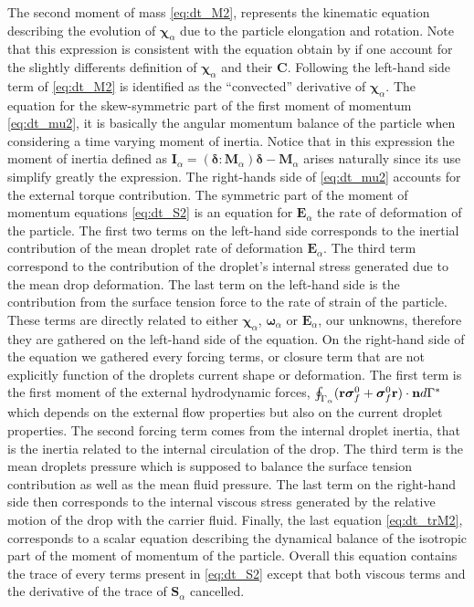 The second moment of mass \ref{eq:dt_M2}, represents the kinematic equation describing the evolution of $\bm\chi_\alpha$ due to the particle elongation and rotation. 
Note that this expression is consistent with the equation obtain by \citet{goddard1967nonlinear} if one account for the slightly differents definition of $\bm\chi_\alpha$ and their \textbf{C}.
Following \citet{goddard1967nonlinear} the left-hand side term of \ref{eq:dt_M2} is identified as the ``convected'' derivative of $\bm\chi_\alpha$. 
The equation for the skew-symmetric part of the first moment of momentum \ref{eq:dt_mu2}, it is basically the angular momentum balance of the particle when considering a time varying moment of inertia.
Notice that in this expression the moment of inertia defined as $\textbf{I}_\alpha = (\bm\delta : \textbf{M}_\alpha)\bm\delta - \textbf{M}_\alpha$ arises naturally since its use simplify greatly the expression. 
The right-hands side of \ref{eq:dt_mu2} accounts for the external torque contribution. 
The symmetric part of the moment of momentum equations \ref{eq:dt_S2} is an equation for $\textbf{E}_\alpha$ the rate of deformation of the particle. 
The first two terms on the left-hand side corresponds to the inertial contribution of the mean droplet rate of deformation $\textbf{E}_\alpha$. 
The third term correspond to the contribution of the droplet's internal stress generated due to the mean drop deformation. 
The last term on the left-hand side is the contribution from the surface tension force to the rate of strain of the particle. 
These terms are directly related to either $\bm\chi_\alpha$, $\bm\omega_\alpha$ or $\textbf{E}_\alpha$, our unknowns, therefore they are gathered on the left-hand side of the equation. 
On the right-hand side of the equation we gathered every forcing terms, or closure term that are not explicitly function of the droplets current shape or deformation.  
The first term is the first moment of the external hydrodynamic forces, $\oint_{\Gamma_{\alpha}} (\textbf{r}\bm\sigma_f^0+ \bm\sigma_f^0\textbf{r})\cdot \textbf{n} d\Gamma^*$ which depends on the external flow properties but also on the current droplet properties. 
The second forcing term comes from the internal droplet inertia, that is the inertia related to the internal circulation of the drop. 
The third term is the mean droplets pressure which is supposed to balance the surface tension contribution as well as the mean fluid pressure. 
The last term on the right-hand side then corresponds to the internal viscous stress generated by the relative motion of the drop with the carrier fluid. 
Finally, the last equation \eqref{eq:dt_trM2}, corresponds to a scalar equation describing the dynamical balance of the isotropic part of the moment of momentum of the particle. 
Overall this equation contains the trace of every terms present in \ref{eq:dt_S2} except that both viscous terms and the derivative of  the trace of $\textbf{S}_\alpha$ cancelled. 


